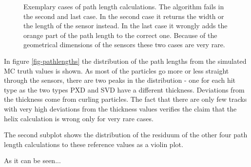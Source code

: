 \begin{figure}
  \caption[Exemplary cases of path length calculations.]{Exemplary cases of path length calculations. The algorithm fails in the second and last case. In the second case it returns the width or the length of the sensor instead. In the last case it wrongly adds the orange part of the path length to the correct one. Because of the geometrical dimensions of the sensors these two cases are very rare.}
  \label{fig-errors-in-path-length}
\end{figure}

In figure \ref{fig-pathlengths} the distribution of the path lengths from the simulated MC truth values is shown. As most of the particles go more or less straight through the sensors, there are two peaks in the distribution - one for each hit type as the two types PXD and SVD have a different thickness. Deviations from the thickness come from curling particles. The fact that there are only few tracks with very high deviations from the thickness values verifies the claim that the helix calculation is wrong only for very rare cases.

The second subplot shows the distribution of the residuum of the other four path length calculations to these reference values as a violin plot.

As it can be seen... 

